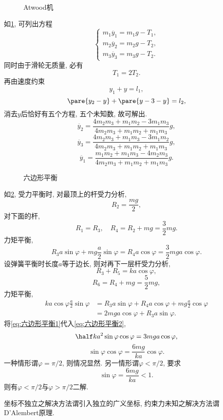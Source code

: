 \documentclass{ctexart}
\begin{document}
\begin{figure}[ht]
    \centering
    \caption{Atwood机}
    \label{fig:Atwood机}
\end{figure}
\begin{ex}[Atwood机]
    \label{ex:Atwood机}
    如\cref{fig:Atwood机}, 可列出方程
    \[ \begin{cases}
        m_1\ddot{y_1} = m_1g - T_1,\\
        m_2\ddot{y_2} = m_2g - T_2,\\
        m_3\ddot{y_3} = m_3g - T_2.
    \end{cases} \]
    同时由于滑轮无质量, 必有
    \[ T_1 = 2T_2. \]
    再由速度约束
    \[ y_1 + y = l_1, \]
    \[ \pare{y_2 - y} + \pare{y-3 - y} = l_2, \]
    消去$y$后恰好有五个方程, 五个未知数, 故可解出.
    \[ \boxed{\ddot{y_2} = \frac{4m_2m_3 + m_1m_2 - 3m_1m_3}{4m_2m_3 + m_1m_2 + m_1m_3}g,}\]
    \[ \boxed{\ddot{y_3}=\frac{4m_2m_3 + m_1m_3 - 3m_1m_2}{4m_2m_3 + m_1m_2 + m_1m_3}g,}\]
    \[ \boxed{\ddot{y_1} = \frac{m_1m_2 + m_1m_3 - 4m_2m_3}{4m_2m_3 + m_1m_2 + m_1m_3}g.} \]
\end{ex}
\begin{figure}[ht]
    \centering
    \caption{六边形平衡}
    \label{fig:六边形平衡}
\end{figure}
\begin{ex}
    如\cref{fig:六边形平衡}, 受力平衡时, 对最顶上的杆受力分析,
    \[ R_2 = \frac{mg}{2}, \]
    对下面的杆,
    \[ R_1 = R_3, \quad R_4 = R_2 + mg = \frac{3}{2}mg. \]
    力矩平衡,
    \begin{equation}
        \label{eq:六边形平衡1}
        R_3 a\sin\varphi + mg\frac{a}{2}\sin\varphi = R_4 a\cos\varphi = \frac{3}{2}mga\cos\varphi. 
    \end{equation}
    设弹簧平衡时长度$a$等于边长, 则对再下一层杆受力分析,
    \[ R_3 + R_5 = ka\cos\varphi, \]
    \[ R_6 = R_4 + mg = \frac{5}{2}mg, \]
    力矩平衡,
    \begin{align}
        ka\cos\varphi \frac{a}{2}\sin\varphi &= R_3 a\sin\varphi + R_4 a\cos\varphi + mg \frac{a}{2}\cos\varphi \\
        \label{eq:六边形平衡2}
        &= 2mga\cos\varphi + R_3 a\sin\varphi. 
    \end{align}
    将\eqref{eq:六边形平衡1}代入\eqref{eq:六边形平衡2},
    \[ \half ka^2\sin\varphi\cos\varphi = 3mga\cos\varphi, \]
    \[ \sin \varphi \cos\varphi = \frac{6mg}{ka}\cos\varphi. \]
    一种情形谓$\varphi = \pi/2$, 则情况显然. 另一情形谓$\varphi < \pi/2$, 要求
    \[ \sin\varphi = \frac{6mg}{ka} < 1. \]
    则有$\varphi <\pi/2$与$\varphi > \pi/2$二解.
\end{ex}
坐标不独立之解决方法谓引入独立的广义坐标, 约束力未知之解决方法谓D'Alembert原理.
\end{document}
